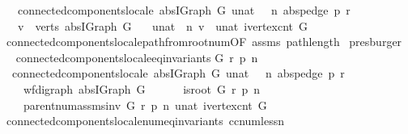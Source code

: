\begin{isabellebody}
\ \ \ {\isachardoublequoteopen}connected{\isacharunderscore}components{\isacharunderscore}locale\ {\isacharparenleft}abs{\isacharunderscore}IGraph\ G{\isacharparenright}\ {\isacharparenleft}unat\ {\isasymcirc}\ \ n{\isacharparenright}\ {\isacharparenleft}abs{\isacharunderscore}pedge\ p{\isacharparenright}\ r{\isachardoublequoteclose}\isanewline
\ \ \ {\isachardoublequoteopen}v\ {\isasymin}\ verts\ {\isacharparenleft}abs{\isacharunderscore}IGraph\ G{\isacharparenright}{\isachardoublequoteclose}\isanewline
\ \ \ {\isachardoublequoteopen}{\isacharparenleft}unat\ {\isasymcirc}\ n{\isacharparenright}\ v\ {\isacharless}\ unat\ {\isacharparenleft}ivertex{\isacharunderscore}cnt\ G{\isacharparenright}{\isachardoublequoteclose}\isanewline
%
\isadelimproof
%
\endisadelimproof
%
\isatagproof
{}\isamarkupfalse%
\ connected{\isacharunderscore}components{\isacharunderscore}locale{\isachardot}path{\isacharunderscore}from{\isacharunderscore}root{\isacharunderscore}num{\isacharbrackleft}OF\ assms{\isacharbrackright}\ path{\isacharunderscore}length\isanewline
{}\isamarkupfalse%
\ presburger%
\endisatagproof
{\isafoldproof}%
%
\isadelimproof
\ \isanewline
%
\endisadelimproof
\isanewline
{}\isamarkupfalse%
\ connected{\isacharunderscore}components{\isacharunderscore}locale{\isacharunderscore}eq{\isacharunderscore}invariants{\isacharprime}{\isacharcolon}\isanewline
{\isachardoublequoteopen}{\isasymAnd}G\ r\ p\ n{\isachardot}\ \isanewline
\ \ {\isacharparenleft}connected{\isacharunderscore}components{\isacharunderscore}locale\ {\isacharparenleft}abs{\isacharunderscore}IGraph\ G{\isacharparenright}\ {\isacharparenleft}unat\ {\isasymcirc}\ \ n{\isacharparenright}\ {\isacharparenleft}abs{\isacharunderscore}pedge\ p{\isacharparenright}\ r{\isacharparenright}\ {\isacharequal}\ \isanewline
\ \ \ \ {\isacharparenleft}wf{\isacharunderscore}digraph\ {\isacharparenleft}abs{\isacharunderscore}IGraph\ G{\isacharparenright}\ {\isasymand}\ \isanewline
\ \ \ \ is{\isacharunderscore}root\ G\ r\ p\ n\ {\isasymand}\ \isanewline
\ \ \ \ parent{\isacharunderscore}num{\isacharunderscore}assms{\isacharunderscore}inv\ G\ r\ p\ n\ {\isacharparenleft}unat\ {\isacharparenleft}ivertex{\isacharunderscore}cnt\ G{\isacharparenright}{\isacharparenright}{\isacharparenright}{\isachardoublequoteclose}\ \isanewline
%
\isadelimproof
\ \ \ \ %
\endisadelimproof
%
\isatagproof
{}\isamarkupfalse%
\ connected{\isacharunderscore}components{\isacharunderscore}locale{\isacharunderscore}num{\isacharunderscore}eq{\isacharunderscore}invariants{\isacharprime}\ cc{\isacharunderscore}num{\isacharunderscore}less{\isacharunderscore}n\ \isamarkupfalse%

\end{isabellebody}

